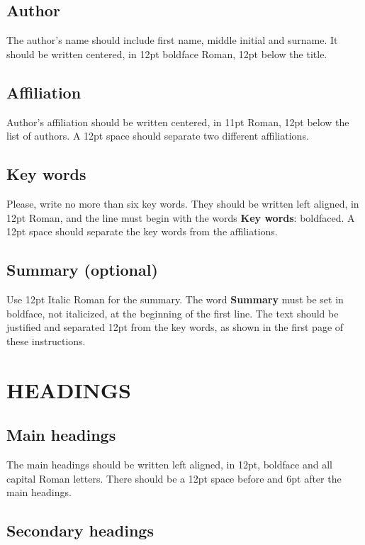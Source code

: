 \documentclass[a4paper]{eccomas_paper-2024}
\begin{document}
\subsection{Author}

The author's name should include first name, middle initial and
surname. It should be written centered, in 12pt boldface Roman,
12pt below the title.

\subsection{Affiliation}

Author's affiliation should be written centered, in 11pt Roman,
12pt below the list of authors. A 12pt space should separate two
different affiliations.

\subsection{Key words}

Please, write no more than six key words. They should be written
left aligned, in 12pt Roman, and the line must begin with the
words {\bf Key words}: boldfaced. A 12pt space should separate the
key words from the affiliations.

\subsection {Summary (optional)}

Use 12pt Italic Roman for the summary. The word {\bf Summary} must
be set in boldface, not italicized, at the beginning of the first
line. The text should be justified and separated 12pt from the key
words, as shown in the first page of these instructions.

\section{HEADINGS}

\subsection{Main headings}

The main headings should be written left aligned, in 12pt,
boldface and all capital Roman letters. There should be a 12pt
space before and 6pt after the main headings.

\subsection {Secondary headings}
\end{document}
